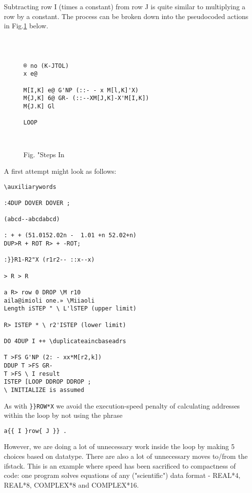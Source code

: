 
Subtracting row I (times a constant) from row J is quite similar to
multiplying a row by a constant. The process can be broken down
into the pseudocoded actions in Fig.\ref{fig:09_03} below.

 
\begin{figure}
\begin{verbatim}

 

® no (K-JTOL)
x e@

M[I,K] e@ G'NP (::- - x M[l,K]'X)
M{J,K] 6@ GR- (::--XM[J,K]-X'M[I,K])
M{J.K] Gl

LOOP

 

\end{verbatim} 
	\caption{Fig. "Steps In }
	\label{fig:09_03}
\end{figure}

A first attempt might look as follows:

\begin{verbatim}
\auxiliarywords

:4DUP DOVER DOVER ;

(abcd--abcdabcd)

: + + (51.0152.02n -  1.01 +n 52.02+n)
DUP>R + ROT R> + -ROT;

:}}R1-R2"X (r1r2-- ::x--x)

> R > R

a R> row 0 DROP \M r10
aila@imioli one.» \Miiaoli
Length iSTEP " \ L'lSTEP (upper limit)

R> ISTEP * \ r2'ISTEP (lower limit)

DO 4DUP I ++ \duplicateaincbaseadrs

T >FS G'NP (2: - xx*M[r2,k])
DDUP T >FS GR-
T >FS \ I result
ISTEP [LOOP DDROP DDROP ;
\ INITIALIZE is assumed

\end{verbatim} 
As with \verb|}}ROW*X| we avoid the execution-speed penalty of
calculating addresses within the loop by not using the phrase
\begin{verbatim}
a{{ I }row{ J }} .
\end{verbatim}
However, we are doing a lot of unnecessary work inside the loop
by making 5 choices based on datatype. There are also a lot of
unnecessary moves to/from the ifstack. This is an example where
speed has been sacrificed to compactness of code: one program
solves equations of any ("scientific") data format - REAL*4,
REAL*8, COMPLEX*8 and COMPLEX*16. 

